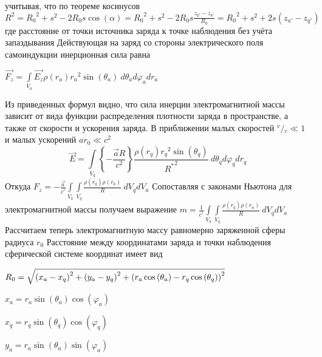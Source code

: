 \documentclass{article}
\begin{document}
учитывая, что по теореме косинусов
${{R}^{2}}={{R}_{0}}^{2}+{{s}^{2}}-2{{R}_{0}}s\cos \left( \alpha  \right)={{R}_{0}}^{2}+{{s}^{2}}-2{{R}_{0}}s\frac{{{z}_{q'}}-{{z}_{a'}}}{{{R}_{0}}}={{R}_{0}}^{2}+{{s}^{2}}+2s\left( {{z}_{a'}}-{{z}_{q'}} \right)$
где  расстояние от точки источника заряда к точке наблюдения без учёта запаздывания
Действующая на заряд со стороны электрического поля самоиндукции инерционная сила равна

$\overrightarrow{{{F}_{z}}}=\int\limits_{{{V}_{a}}}{\overrightarrow{{{E}_{z}}}\rho \left( {{r}_{a}} \right){{r}_{a}}^{2}\sin \left( {{\theta }_{a}} \right)}\ d{{\theta }_{a}}d{{\varphi }_{a}}d{{r}_{a}}$


Из приведенных формул видно, что сила инерции электромагнитной массы зависит от вида функции распределения плотности заряда в пространстве, а также от скорости и ускорения заряда.
В приближении малых скоростей ${}^{v}/{}_{c}\ll 1$  и малых ускорений $a{{r}_{0}}\ll {{c}^{2}}$
\[\overrightarrow{E}=\int\limits_{{{V}_{q}}}{\left\{ -\frac{\overrightarrow{a}R}{{{c}^{2}}} \right\}\frac{\rho \left( {{r}_{q}} \right){{r}_{q}}^{2}\sin \left( {{\theta }_{q}} \right)}{{{R}^{*}}^{2}}\ }d{{\theta }_{q}}d{{\varphi }_{q}}d{{r}_{q}}\]
Откуда
${{F}_{z}}=-\frac{\overrightarrow{a}}{{{c}^{^{2}}}}\int\limits_{{{V}_{a}}}{\int\limits_{{{V}_{q}}}{\frac{\rho \left( {{r}_{q}} \right)\rho \left( {{r}_{a}} \right)}{R}}}\ d{{V}_{q}}d{{V}_{a}}$
Сопоставляя с законами Ньютона для электромагнитной массы получаем выражение
$m=\frac{1}{{{c}^{^{2}}}}\int\limits_{{{V}_{a}}}{\int\limits_{{{V}_{q}}}{\frac{\rho \left( {{r}_{q}} \right)\rho \left( {{r}_{a}} \right)}{R}}}\ d{{V}_{q}}d{{V}_{a}}$
Рассчитаем теперь электромагнитную массу равномерно заряженной сферы радиуса ${{r}_{0}}$
Расстояние между координатами заряда и точки наблюдения сферической системе координат имеет вид

${{R}_{0}}=\sqrt{\\
  { { \left( {{x}_{a}}  -  {{x}_{q}}\right) }^{2}} + \\
  { { \left( {{y}_{a}}  -  {{y}_{q}}\right) }^{2}} + \\
  { { \left( {{r}_{a}}\cos \left( {{\theta }_{a}} \right) - {{r}_{q}}\cos \left( {{\theta }_{q}} \right) \right)}^{2}}  }$


${{x}_{a}} = {{r}_{a}}\sin \left( {{\theta }_{a}} \right)\cos \left( {{\varphi }_{a}} \right)$

${{x}_{q}} = {{r}_{q}}\sin \left( {{\theta }_{q}} \right)\cos \left( {{\varphi }_{q}} \right)$

${{y}_{a}} = {{r}_{a}}\sin \left( {{\theta }_{a}} \right)\sin \left( {{\varphi }_{a}} \right)$
\end{document}
